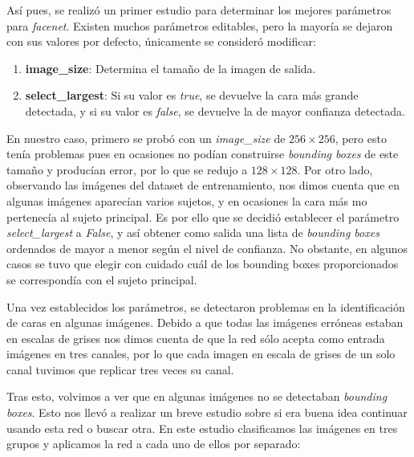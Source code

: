             \medskip

            \noindent Así pues, se realizó un primer estudio para determinar los mejores parámetros para \textit{facenet}. Existen muchos parámetros editables, pero la mayoría se dejaron con sus valores por defecto, únicamente se consideró modificar: 

            \begin{enumerate}
                \item \textbf{image\_size}: Determina el tamaño de la imagen de salida.
                \item \textbf{select\_largest}: Si su valor es \textit{true}, se devuelve la cara más grande detectada, y si su valor es \textit{false}, se devuelve la de mayor confianza detectada.
            \end{enumerate}


            \noindent En nuestro caso, primero se probó con un \textit{image\_size} de $256 \times 256$, pero esto tenía problemas pues en ocasiones no podían construirse \textit{bounding boxes} de este tamaño y producían error, por lo que se redujo a $128 \times 128$. Por otro lado, observando las imágenes del dataset de entrenamiento, nos dimos cuenta que en algunas imágenes aparecían varios sujetos, y en ocasiones la cara más  mo pertenecía al sujeto principal. Es por ello que se decidió establecer el parámetro \textit{select\_largest} a \textit{False}, y así obtener como salida una lista de \textit{bounding boxes} ordenados de mayor a menor según el nivel de confianza. No obstante, en algunos casos se tuvo que elegir con cuidado cuál de los bounding boxes proporcionados se correspondía con el sujeto principal.

            \medskip

            \noindent Una vez establecidos los parámetros, se detectaron problemas en la identificación de caras en algunas imágenes. Debido a que todas las imágenes erróneas estaban en escalas de grises nos dimos cuenta de que la red sólo acepta como entrada imágenes en tres canales, por lo que cada imagen en escala de grises de un solo canal tuvimos que replicar tres veces su canal. 
        
            \medskip
        
            \noindent Tras esto, volvimos a ver que en algunas imágenes no se detectaban \textit{bounding boxes}. Esto nos llevó a realizar un breve estudio sobre si era buena idea continuar usando esta red o buscar otra. En este estudio clasificamos las imágenes en tres grupos y aplicamos la red a cada uno de ellos por separado: 


